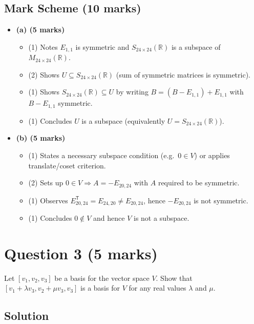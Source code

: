 \documentclass[12pt]{article}
\begin{document}
\subsection{Mark Scheme (10 marks)}
\begin{itemize}[leftmargin=1.6em]
  \item \textbf{(a) (5 marks)}
  \begin{itemize}[leftmargin=1.6em]
    \item (1) Notes $E_{1,1}$ is symmetric and $S_{24\times 24}(\mathbb{R})$ is a subspace of $M_{24\times 24}(\mathbb{R})$.
    \item (2) Shows $U\subseteq S_{24\times 24}(\mathbb{R})$ (sum of symmetric matrices is symmetric).
    \item (1) Shows $S_{24\times 24}(\mathbb{R})\subseteq U$ by writing $B=(B-E_{1,1})+E_{1,1}$ with $B-E_{1,1}$ symmetric.
    \item (1) Concludes $U$ is a subspace (equivalently $U=S_{24\times 24}(\mathbb{R})$).
  \end{itemize}

  \item \textbf{(b) (5 marks)}
  \begin{itemize}[leftmargin=1.6em]
    \item (1) States a necessary subspace condition (e.g.\ $0\in V$) or applies translate/coset criterion.
    \item (2) Sets up $0\in V\Rightarrow A=-E_{20,24}$ with $A$ required to be symmetric.
    \item (1) Observes $E_{20,24}^{\mathsf T}=E_{24,20}\ne E_{20,24}$, hence $-E_{20,24}$ is not symmetric.
    \item (1) Concludes $0\notin V$ and hence $V$ is not a subspace.
  \end{itemize}
\end{itemize}

\newpage

\section{Question 3 \hfill (5 marks)}
Let $[v_1, v_2, v_3]$ be a basis for the vector space $V$. Show that $[v_1 + \lambda v_3, v_2 + \mu v_3, v_3]$ is a basis for $V$ for any real values $\lambda$ and $\mu$.
\bigskip
\subsection{Solution}
\end{document}
